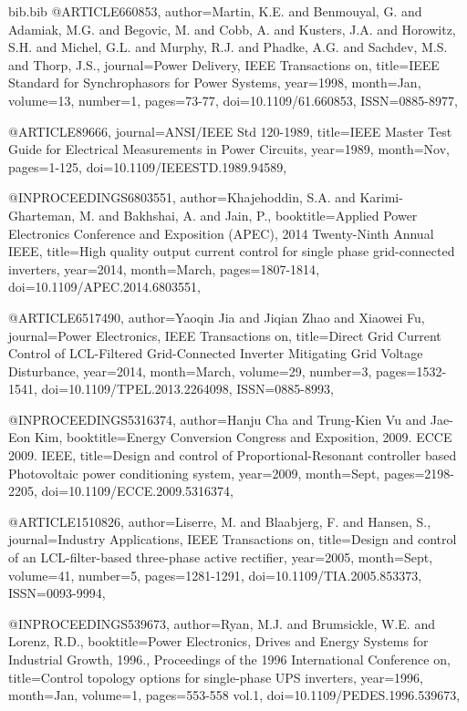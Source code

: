 \begin{filecontents}{bib.bib}
@ARTICLE{660853, 
author={Martin, K.E. and Benmouyal, G. and Adamiak, M.G. and Begovic, M. and Cobb, A. and Kusters, J.A. and Horowitz, S.H. and Michel, G.L. and Murphy, R.J. and Phadke, A.G. and Sachdev, M.S. and Thorp, J.S.}, 
journal={Power Delivery, IEEE Transactions on}, 
title={IEEE Standard for Synchrophasors for Power Systems}, 
year={1998}, 
month={Jan}, 
volume={13}, 
number={1}, 
pages={73-77}, 
doi={10.1109/61.660853}, 
ISSN={0885-8977},}

@ARTICLE{89666, 
journal={ANSI/IEEE Std 120-1989}, 
title={IEEE Master Test Guide for Electrical Measurements in Power Circuits}, 
year={1989}, 
month={Nov}, 
pages={1-125}, 
doi={10.1109/IEEESTD.1989.94589},}

@INPROCEEDINGS{6803551, 
author={Khajehoddin, S.A. and Karimi-Gharteman, M. and Bakhshai, A. and Jain, P.}, 
booktitle={Applied Power Electronics Conference and Exposition (APEC), 2014 Twenty-Ninth Annual IEEE}, 
title={High quality output current control for single phase grid-connected inverters}, 
year={2014}, 
month={March}, 
pages={1807-1814}, 
doi={10.1109/APEC.2014.6803551},}

@ARTICLE{6517490, 
author={Yaoqin Jia and Jiqian Zhao and Xiaowei Fu}, 
journal={Power Electronics, IEEE Transactions on}, 
title={Direct Grid Current Control of LCL-Filtered Grid-Connected Inverter Mitigating Grid Voltage Disturbance}, 
year={2014}, 
month={March}, 
volume={29}, 
number={3}, 
pages={1532-1541}, 
doi={10.1109/TPEL.2013.2264098}, 
ISSN={0885-8993},}

@INPROCEEDINGS{5316374, 
author={Hanju Cha and Trung-Kien Vu and Jae-Eon Kim}, 
booktitle={Energy Conversion Congress and Exposition, 2009. ECCE 2009. IEEE}, 
title={Design and control of Proportional-Resonant controller based Photovoltaic power conditioning system}, 
year={2009}, 
month={Sept}, 
pages={2198-2205}, 
doi={10.1109/ECCE.2009.5316374},}

@ARTICLE{1510826, 
author={Liserre, M. and Blaabjerg, F. and Hansen, S.}, 
journal={Industry Applications, IEEE Transactions on}, 
title={Design and control of an LCL-filter-based three-phase active rectifier}, 
year={2005}, 
month={Sept}, 
volume={41}, 
number={5}, 
pages={1281-1291}, 
doi={10.1109/TIA.2005.853373}, 
ISSN={0093-9994},}

@INPROCEEDINGS{539673, 
author={Ryan, M.J. and Brumsickle, W.E. and Lorenz, R.D.}, 
booktitle={Power Electronics, Drives and Energy Systems for Industrial Growth, 1996., Proceedings of the 1996 International Conference on}, 
title={Control topology options for single-phase UPS inverters}, 
year={1996}, 
month={Jan}, 
volume={1}, 
pages={553-558 vol.1}, 
doi={10.1109/PEDES.1996.539673},}


\end{filecontents}
